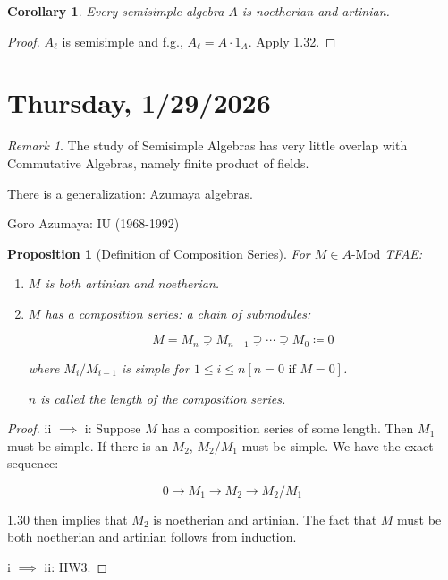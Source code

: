 \documentclass{article}
\theoremstyle{definition}
\theoremstyle{plain}
\newtheorem{proposition}[theorem]{Proposition}
\newtheorem{corollary}[theorem]{Corollary}
\theoremstyle{remark}
\newtheorem*{remark*}{Remark}
\begin{document}
    \begin{corollary}
        Every semisimple algebra \(A\) is noetherian and artinian.
    \end{corollary}

    \begin{proof}
        \(A_\ell\) is semisimple and f.g., \(A_\ell = A \cdot 1_A\). Apply 1.32.
    \end{proof}

    \section*{Thursday, 1/29/2026}
    
    \begin{remark*}
        The study of Semisimple Algebras has very little overlap with Commutative Algebras, namely finite product of fields.

        There is a generalization: \underline{Azumaya algebras}.

        Goro Azumaya: IU (1968-1992)
    \end{remark*}

    \begin{proposition}
        [Definition of Composition Series]
        For \(M\in A\text{-Mod}\) TFAE:

        \begin{enumerate}[label=\roman*)]
            \item \(M\) is both artinian and noetherian.
            \item \(M\) has a \underline{composition series}: a chain of submodules:
            
            \[
                M = M_n \supsetneq M_{n-1} \supsetneq \cdots \supsetneq M_0 \coloneqq 0
            \]

            where \(M_i / M_{i-1}\) is simple for \(1 \leq i \leq n [n=0 \text{ if } M = 0]\).

            \(n\) is called the \underline{length of the composition series}.
        \end{enumerate} 
    \end{proposition}

    \begin{proof}
        ii \(\implies\) i: Suppose \(M\) has a composition series of some length. Then \(M_1\) must be simple. If there is an \(M_2\), \(M_2 / M_1\) must be simple. We have the exact sequence:

        \[
            0 \to M_1 \to M_2 \to M_2 / M_1
        \]

        1.30 then implies that \(M_2\) is noetherian and artinian. The fact that \(M\) must be both noetherian and artinian follows from induction.

        i \(\implies\) ii: HW3.
    \end{proof}
\end{document}
